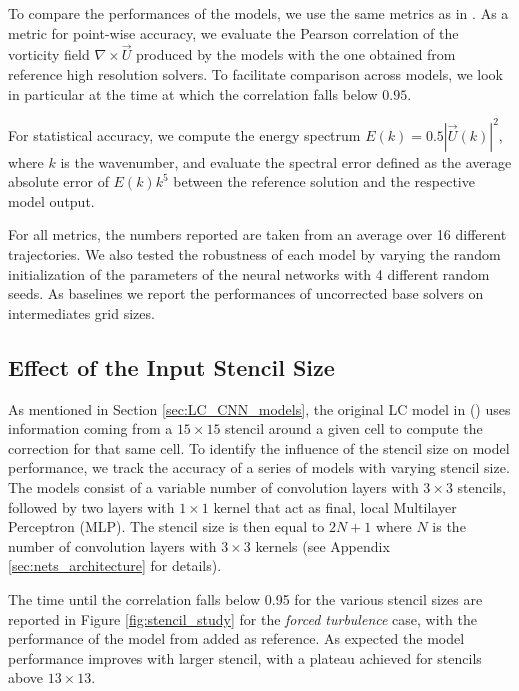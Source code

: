 To compare the performances of the models, we use the same metrics as in \citeauthor{kochkov2021machine}. As a metric for point-wise accuracy, we evaluate the Pearson correlation of the vorticity field $\nabla\times\vec{U}$ produced by the models with the one obtained from reference high resolution solvers. To facilitate comparison across models, we look in particular at the time at which the correlation falls below $0.95$. 

For statistical accuracy, we compute the energy spectrum $E(k) = 0.5 |\vec{U}(k)|^2$, where $k$ is the wavenumber, and evaluate the spectral error defined as the average absolute error of $E(k)k^5$ between the reference solution and the respective model output.

For all metrics, the numbers reported are taken from an average over 16 different trajectories. We also tested the robustness of each model by varying the random initialization of the parameters of the neural networks with 4 different random seeds. As baselines we report the performances of uncorrected base solvers on intermediates grid sizes.

\subsection{Effect of the Input Stencil Size}
\label{sec:stencil_study}

As mentioned in Section \ref{sec:LC_CNN_models}, the original LC model in \citeauthor{kochkov2021machine} (\citeyear{kochkov2021machine}) uses information coming from a $15\times15$ stencil around a given cell to compute the correction for that same cell. To identify the influence of the stencil size on model performance, we track the accuracy of a series of models with varying stencil size. The models consist of a variable number of convolution layers with $3\times3$ stencils, followed by two layers with $1\times1$ kernel that act as final, local Multilayer Perceptron (MLP). The stencil size is then equal to $2N + 1$ where $N$ is the number of convolution layers with $3\times3$ kernels (see Appendix \ref{sec:nets_architecture} for details).

The time until the correlation falls below 0.95 for the various stencil sizes are reported in Figure \ref{fig:stencil_study} for the \textit{forced turbulence} case, with the performance of the model from \citeauthor{kochkov2021machine} added as reference. As expected the model performance improves with larger stencil, with a plateau achieved for stencils above $13\times13$.

